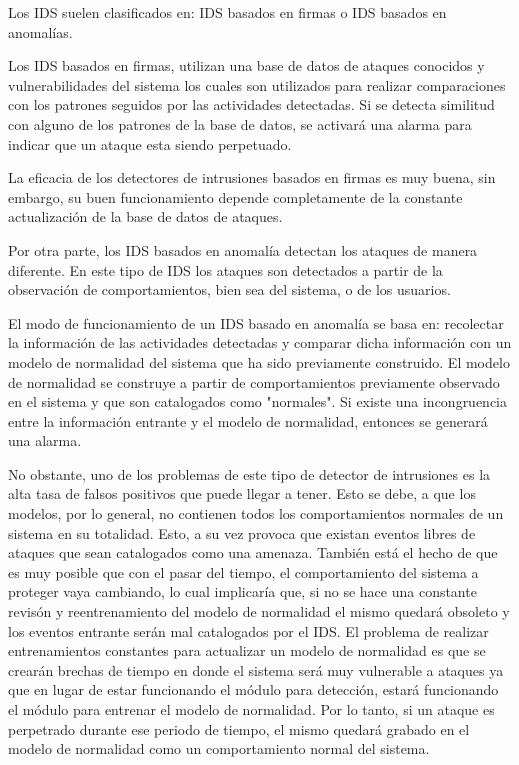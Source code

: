 Los IDS suelen clasificados en: IDS basados en firmas o 		IDS 	basados en anomalías. 

Los IDS basados en firmas, utilizan una base de datos de ataques conocidos y vulnerabilidades del sistema los cuales son utilizados para realizar comparaciones con los patrones seguidos por las actividades detectadas. Si se detecta similitud con alguno de los patrones de la base de datos, se activará una alarma para indicar que un ataque esta siendo perpetuado.

La eficacia de los detectores de intrusiones basados en firmas es muy buena, sin embargo, su buen funcionamiento depende completamente de la constante actualización de la base de datos de ataques.

Por otra parte, los IDS basados en anomalía detectan los ataques de manera diferente. En este tipo de IDS los ataques son detectados a partir de la observación de comportamientos, bien sea del sistema, o de los usuarios. 

El modo de funcionamiento de un IDS basado en anomalía se basa en: recolectar la información de las actividades detectadas y comparar dicha información con un modelo de normalidad del sistema que ha sido previamente construido. El modelo de normalidad se construye a partir de comportamientos previamente observado en el sistema y que son catalogados como "normales". Si existe una incongruencia entre la información entrante y el modelo de normalidad, entonces se generará una alarma.

No obstante, uno de los problemas de este tipo de detector de intrusiones es la alta tasa de falsos positivos que puede llegar a tener. Esto se debe, a que los modelos, por lo general, no contienen todos los comportamientos normales de un sistema en su totalidad. Esto, a su vez provoca que existan eventos libres de ataques que sean catalogados como una amenaza. Tambi\'en está el hecho de que es muy posible que con el pasar del tiempo, el comportamiento del sistema a proteger vaya cambiando, lo cual implicar\'ia que, si no se hace una constante revis\'on y reentrenamiento del modelo de normalidad el mismo quedar\'a obsoleto y los eventos entrante ser\'an mal catalogados por el IDS. El problema de realizar entrenamientos constantes para actualizar un modelo de normalidad es que se crearán brechas de tiempo en donde el sistema ser\'a muy vulnerable a ataques ya que en lugar de estar funcionando el módulo para detección, estar\'a funcionando el módulo para entrenar el modelo de normalidad. Por lo tanto, si un ataque es perpetrado durante ese periodo de tiempo, el mismo quedar\'a grabado en el modelo de normalidad como un comportamiento normal del sistema.

